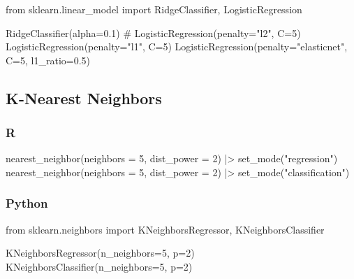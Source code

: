 \documentclass[
  letterpaper,
  DIV=11,
  numbers=noendperiod]{scrreprt}
\newenvironment{Shaded}{\begin{snugshade}}{\end{snugshade}}
\newcommand{\AttributeTok}[1]{\textcolor[rgb]{0.40,0.46,0.14}{#1}}
\newcommand{\CommentTok}[1]{\textcolor[rgb]{0.37,0.37,0.37}{#1}}
\newcommand{\DecValTok}[1]{\textcolor[rgb]{0.68,0.00,0.00}{#1}}
\newcommand{\FloatTok}[1]{\textcolor[rgb]{0.68,0.00,0.00}{#1}}
\newcommand{\FunctionTok}[1]{\textcolor[rgb]{0.28,0.35,0.67}{#1}}
\newcommand{\ImportTok}[1]{\textcolor[rgb]{0.00,0.46,0.62}{#1}}
\newcommand{\NormalTok}[1]{\textcolor[rgb]{0.00,0.46,0.62}{#1}}
\newcommand{\OperatorTok}[1]{\textcolor[rgb]{0.37,0.37,0.37}{#1}}
\newcommand{\SpecialCharTok}[1]{\textcolor[rgb]{0.37,0.37,0.37}{#1}}
\newcommand{\StringTok}[1]{\textcolor[rgb]{0.13,0.47,0.30}{#1}}
\begin{document}
\begin{Shaded}
\begin{Highlighting}[]
\ImportTok{from}\NormalTok{ sklearn.linear\_model }\ImportTok{import}\NormalTok{ RidgeClassifier, LogisticRegression}

\NormalTok{RidgeClassifier(alpha}\OperatorTok{=}\FloatTok{0.1}\NormalTok{) }\CommentTok{\# LogisticRegression(penalty="l2", C=5)}
\NormalTok{LogisticRegression(penalty}\OperatorTok{=}\StringTok{"l1"}\NormalTok{, C}\OperatorTok{=}\DecValTok{5}\NormalTok{)}
\NormalTok{LogisticRegression(penalty}\OperatorTok{=}\StringTok{"elasticnet"}\NormalTok{, C}\OperatorTok{=}\DecValTok{5}\NormalTok{, l1\_ratio}\OperatorTok{=}\FloatTok{0.5}\NormalTok{)}
\end{Highlighting}
\end{Shaded}

\hypertarget{k-nearest-neighbors}{%
\subsection{K-Nearest Neighbors}\label{k-nearest-neighbors}}

\hypertarget{r-74}{%
\subsubsection{R}\label{r-74}}

\begin{Shaded}
\begin{Highlighting}[]
\FunctionTok{nearest\_neighbor}\NormalTok{(}\AttributeTok{neighbors =} \DecValTok{5}\NormalTok{, }\AttributeTok{dist\_power =} \DecValTok{2}\NormalTok{) }\SpecialCharTok{|\textgreater{}} \FunctionTok{set\_mode}\NormalTok{(}\StringTok{"regression"}\NormalTok{)}
\FunctionTok{nearest\_neighbor}\NormalTok{(}\AttributeTok{neighbors =} \DecValTok{5}\NormalTok{, }\AttributeTok{dist\_power =} \DecValTok{2}\NormalTok{) }\SpecialCharTok{|\textgreater{}} \FunctionTok{set\_mode}\NormalTok{(}\StringTok{"classification"}\NormalTok{)}
\end{Highlighting}
\end{Shaded}

\hypertarget{python-74}{%
\subsubsection{Python}\label{python-74}}

\begin{Shaded}
\begin{Highlighting}[]
\ImportTok{from}\NormalTok{ sklearn.neighbors }\ImportTok{import}\NormalTok{ KNeighborsRegressor, KNeighborsClassifier}

\NormalTok{KNeighborsRegressor(n\_neighbors}\OperatorTok{=}\DecValTok{5}\NormalTok{, p}\OperatorTok{=}\DecValTok{2}\NormalTok{)}
\NormalTok{KNeighborsClassifier(n\_neighbors}\OperatorTok{=}\DecValTok{5}\NormalTok{, p}\OperatorTok{=}\DecValTok{2}\NormalTok{)}
\end{Highlighting}
\end{Shaded}
\end{document}
